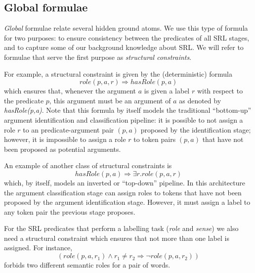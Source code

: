 \subsection{Global formulae}
\label{sec:global}

\emph{Global} formulae relate several hidden ground atoms. We use this type of formula for two purposes: to ensure consistency between the predicates of all SRL stages, and to capture some of our background knowledge about SRL. We will refer to formulae that serve the first purpose as \emph{structural constraints}. 

For example, a structural constraint is given by the (deterministic) formula
\[role(p,a,r) \Rightarrow hasRole(p,a)\]
which ensures that, whenever the argument $a$ is given a label $r$ with respect to the predicate $p$, this argument must be an argument of $a$ as denoted by \emph{hasRole(p,a)}. Note that this formula by itself models the traditional ``bottom-up'' argument identification and classification pipeline: it is possible to not assign a role $r$ to an predicate-argument pair $(p,a)$ proposed by the identification stage; however, it is impossible to assign a role $r$ to token pairs $(p,a)$ that have not been proposed as potential arguments.

An example of another class of structural constraints is 
\[
hasRole(p,a)\Rightarrow\exists r.role(p,a,r)
\]
which, by itself, models an inverted or ``top-down'' pipeline. In this architecture the argument classification stage can assign roles to tokens that have not been proposed by the argument identification stage. However, it must assign a label to any token pair the previous stage proposes. 


For the SRL predicates that perform a labelling task (\emph{role} and \emph{sense}) we also need a structural constraint which ensures that not more than one label is assigned. For instance,
\[
(role(p,a,r_1) \wedge r_1 \neq r_2 \Rightarrow \neg role(p,a,r_2)  )
\]
forbids two different semantic roles for a pair of words. 

